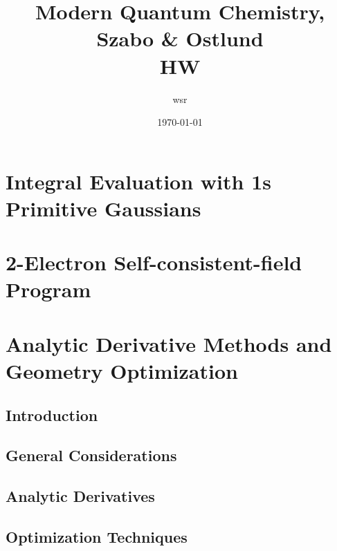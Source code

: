 \documentclass[a4paper]{article}
\title{\textbf{Modern Quantum Chemistry, Szabo \& Ostlund}\\HW}
\author{wsr
\vspace{5pt}\\
}
\date{\today} %
\numberwithin{equation}{subsection}
\begin{document}

\maketitle

\tableofcontents

\newpage


\section{Integral Evaluation with 1s Primitive Gaussians}

\section{2-Electron Self-consistent-field Program}

\section{Analytic Derivative Methods and Geometry Optimization}
\subsection{Introduction}

\subsection{General Considerations}

\subsection{Analytic Derivatives}

\subsection{Optimization Techniques}
\end{document}
